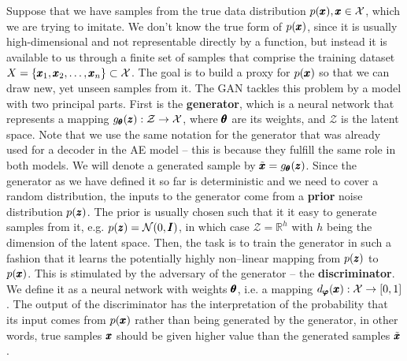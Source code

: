 Suppose that we have samples from the true data distribution $p(\pmb{{x}}),\pmb{{x}}\in\mathcal{X}$, which we are trying to imitate. We don't know the true form of $p(\pmb{{x}})$, since it is usually high-dimensional and not representable directly by a function, but instead it is available to us through a finite set of samples that comprise the training dataset $X = \lbrace \pmb{{x}}_1, \pmb{{x}}_2, \ldots, \pmb{{x}}_n \rbrace \subset \mathcal{X}$. The goal is to build a proxy for $p(\pmb{{x}})$ so that we can draw new, yet unseen samples from it. The GAN tackles this problem by a model with two principal parts. First is the \textbf{generator}, which is a neural network that represents a mapping $g_{\pmb{{\theta}}}(\pmb{{z}}):\mathcal{Z}\rightarrow\mathcal{X}$, where $\pmb{{\theta}}$ are its weights, and $\mathcal{Z}$ is the latent space. Note that we use the same notation for the generator that was already used for a decoder in the AE model -- this is because they fulfill the same role in both models. We will denote a generated sample by $\tilde{\pmb{{x}}} = g_{\pmb{{\theta}}}(\pmb{{z}})$. Since the generator as we have defined it so far is deterministic and we need to cover a random distribution, the inputs to the generator come from a \textbf{prior} noise distribution $p(\pmb{{z}})$. The prior is usually chosen such that it it easy to generate samples from it, e.g. $p(\pmb{{z}}) = \mathcal{N}(0,\pmb{{I}})$, in which case $\mathcal{Z} = \mathbb{R}^h$ with $h$ being the dimension of the latent space. Then, the task is to train the generator in such a fashion that it learns the potentially highly non--linear mapping from $p(\pmb{{z}})$ to $p(\pmb{{x}})$. This is stimulated by the adversary of the generator -- the \textbf{discriminator}. We define it as a neural network with weights $\pmb{{\theta}}$, i.e. a mapping $d_{\vc{\varphi}}(\vc{x}):\mathcal{X}\rightarrow\left[0,1\right]$. The output of the discriminator has the interpretation of the probability that its input comes from $p(\pmb{{x}})$ rather than being generated by the generator, in other words, true samples $\pmb{{x}}$ should be given higher value than the generated samples $\tilde{\pmb{{x}}}$.

